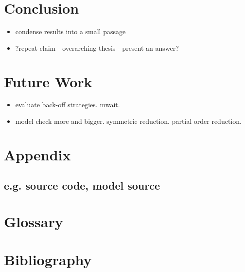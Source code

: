 \documentclass[a4paper, 10pt]{article}
\begin{document}
\section{Conclusion}
\begin{itemize}
	\item condense results into a small passage
	\item ?repeat claim - overarching thesis - present an answer?
\end{itemize}

\section{Future Work}
\begin{itemize}
	\item evaluate back-off strategies. mwait.
	\item model check more and bigger. symmetrie reduction. partial order reduction.
\end{itemize}


\appendix

\pagebreak
\section{Appendix}
\subsection{e.g. source code, model source}

\pagebreak
\section{Glossary}

\pagebreak
\section{Bibliography}
\renewcommand\refname{\vskip -1cm} %
\nocite{*} %

{}
\end{document}
